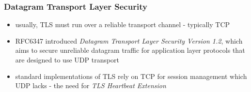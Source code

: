 \documentclass[
    11pt, %
    aspectratio=169, %
]{beamer}
\begin{document}
\begin{frame}
	\frametitle{Datagram Transport Layer Security}
	


        \begin{itemize}
            \item usually, TLS must run over a reliable transport channel - typically TCP
            \newline
            \item RFC6347 introduced \emph{Datagram Transport Layer Security Version 1.2}, \newline which aims to secure unreliable datagram traffic for application \newline layer protocols that are designed to use UDP transport 
            \newline
            \item standard implementations of TLS rely on TCP for session \newline management which UDP lacks - the need for \emph{TLS Heartbeat Extension}
        \end{itemize}
    
 
\end{frame}
\end{document}
